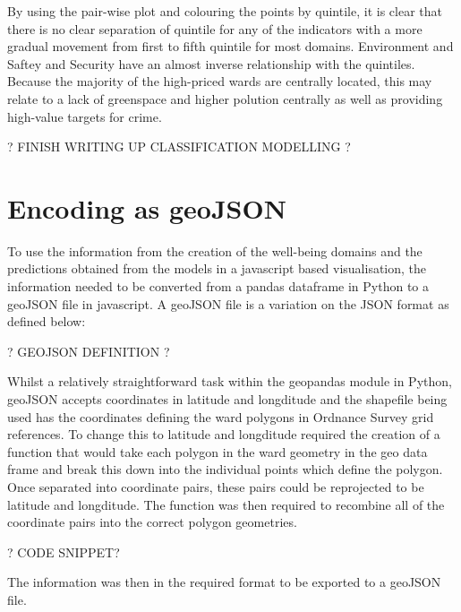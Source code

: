 By using the pair-wise plot and colouring the points by quintile, it is clear that there is no clear separation of quintile for any of the indicators with a more gradual movement from first to fifth quintile for most domains. Environment and Saftey and Security have an almost inverse relationship with the quintiles. Because the majority of the high-priced wards are centrally located, this may relate to a lack of greenspace and higher polution centrally as well as providing high-value targets for crime. 

? FINISH WRITING UP CLASSIFICATION MODELLING ?



\section{Encoding as geoJSON}

To use the information from the creation of the well-being domains and the predictions obtained from the models in a javascript based visualisation, the information needed to be converted from a pandas dataframe in Python to a geoJSON file in javascript. A geoJSON file is a variation on the JSON format as defined below:

? GEOJSON DEFINITION ?

Whilst a relatively straightforward task within the geopandas module in Python, geoJSON accepts coordinates in latitude and longditude and the shapefile being used has the coordinates defining the ward polygons in Ordnance Survey grid references. To change this to latitude and longditude required the creation of a function that would take each polygon in the ward geometry in the geo data frame and break this down into the individual points which define the polygon. Once separated into coordinate pairs, these pairs could be reprojected to be latitude and longditude. The function was then required to recombine all of the coordinate pairs into the correct polygon geometries.

? CODE SNIPPET?

The information was then in the required format to be exported to a geoJSON file.


